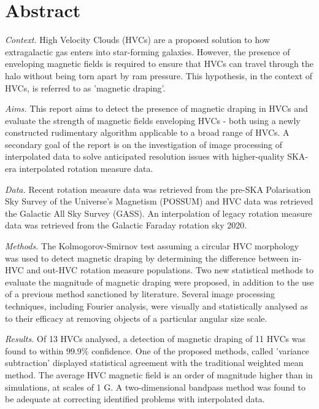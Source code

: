 \chapter*{Abstract}

\noindent\textit{Context.} High Velocity Clouds (HVCs) are a proposed solution to how extragalactic gas enters into star-forming galaxies. However, the presence of enveloping magnetic fields is required to ensure that HVCs can travel through the halo without being torn apart by ram pressure. This hypothesis, in the context of HVCs, is referred to as 'magnetic draping'.

\noindent\textit{Aims.} This report aims to detect the presence of magnetic draping in HVCs and evaluate the strength of magnetic fields enveloping HVCs - both using a newly constructed rudimentary algorithm applicable to a broad range of HVCs. A secondary goal of the report is on the investigation of image processing of interpolated data to solve anticipated resolution issues with higher-quality SKA-era interpolated rotation measure data.

\noindent\textit{Data.} Recent rotation measure data was retrieved from the pre-SKA Polarisation Sky Survey of the Universe's Magnetism (POSSUM) and HVC data was retrieved the Galactic All Sky Survey (GASS). An interpolation of legacy rotation measure data was retrieved from the Galactic Faraday rotation sky 2020.

\noindent\textit{Methods.} The Kolmogorov-Smirnov test assuming a circular HVC morphology was used to detect magnetic draping by determining the difference between in-HVC and out-HVC rotation measure populations. Two new statistical methods to evaluate the magnitude of magnetic draping were proposed, in addition to the use of a previous method sanctioned by literature. Several image processing techniques, including Fourier analysis, were visually and statistically analysed as to their efficacy at removing objects of a particular angular size scale.

\noindent\textit{Results.} Of 13 HVCs analysed, a detection of magnetic draping of 11 HVCs was found to within 99.9\% confidence. One of the proposed methods, called 'variance subtraction' displayed statistical agreement with the traditional weighted mean method. The average HVC magnetic field is an order of magnitude higher than in simulations, at scales of 1 \textmu G. A two-dimensional bandpass method was found to be adequate at correcting identified problems with interpolated data.


